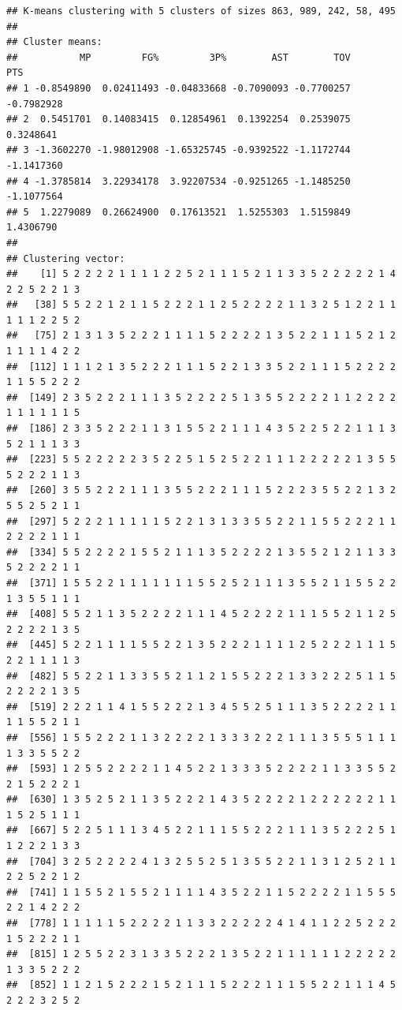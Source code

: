 \documentclass[]{book}
\begin{document}
\begin{verbatim}
## K-means clustering with 5 clusters of sizes 863, 989, 242, 58, 495
## 
## Cluster means:
##           MP         FG%         3P%        AST        TOV        PTS
## 1 -0.8549890  0.02411493 -0.04833668 -0.7090093 -0.7700257 -0.7982928
## 2  0.5451701  0.14083415  0.12854961  0.1392254  0.2539075  0.3248641
## 3 -1.3602270 -1.98012908 -1.65325745 -0.9392522 -1.1172744 -1.1417360
## 4 -1.3785814  3.22934178  3.92207534 -0.9251265 -1.1485250 -1.1077564
## 5  1.2279089  0.26624900  0.17613521  1.5255303  1.5159849  1.4306790
## 
## Clustering vector:
##    [1] 5 2 2 2 2 1 1 1 1 2 2 5 2 1 1 1 5 2 1 1 3 3 5 2 2 2 2 2 1 4 2 2 5 2 2 1 3
##   [38] 5 5 2 2 1 2 1 1 5 2 2 2 1 1 2 5 2 2 2 2 1 1 3 2 5 1 2 2 1 1 1 1 1 2 2 5 2
##   [75] 2 1 3 1 3 5 2 2 2 1 1 1 1 5 2 2 2 2 1 3 5 2 2 1 1 1 5 2 1 2 1 1 1 1 4 2 2
##  [112] 1 1 1 2 1 3 5 2 2 2 1 1 1 5 2 2 1 3 3 5 2 2 1 1 1 5 2 2 2 2 1 1 5 5 2 2 2
##  [149] 2 3 5 2 2 2 1 1 1 3 5 2 2 2 2 5 1 3 5 5 2 2 2 2 1 1 2 2 2 2 1 1 1 1 1 1 5
##  [186] 2 3 3 5 2 2 2 1 1 3 1 5 5 2 2 1 1 1 4 3 5 2 2 5 2 2 1 1 1 3 5 2 1 1 1 3 3
##  [223] 5 5 2 2 2 2 2 3 5 2 2 5 1 5 2 5 2 2 1 1 1 2 2 2 2 2 1 3 5 5 5 2 2 2 1 1 3
##  [260] 3 5 5 2 2 2 1 1 1 3 5 5 2 2 2 1 1 1 5 2 2 2 3 5 5 2 2 1 3 2 5 5 2 5 2 1 1
##  [297] 5 2 2 2 1 1 1 1 1 5 2 2 1 3 1 3 3 5 5 2 2 1 1 5 5 2 2 2 1 1 2 2 2 2 1 1 1
##  [334] 5 5 2 2 2 2 1 5 5 2 1 1 1 3 5 2 2 2 2 1 3 5 5 2 1 2 1 1 3 3 5 2 2 2 2 1 1
##  [371] 1 5 5 2 2 1 1 1 1 1 1 1 5 5 2 5 2 1 1 1 3 5 5 2 1 1 5 5 2 2 1 3 5 5 1 1 1
##  [408] 5 5 2 1 1 3 5 2 2 2 2 1 1 1 4 5 2 2 2 2 1 1 1 5 5 2 1 1 2 5 2 2 2 2 1 3 5
##  [445] 5 2 2 1 1 1 1 5 5 2 2 1 3 5 2 2 2 1 1 1 1 2 5 2 2 2 1 1 1 5 2 2 1 1 1 1 3
##  [482] 5 5 2 2 1 1 3 3 5 5 2 1 1 2 1 5 5 2 2 2 1 3 3 2 2 2 5 1 1 5 2 2 2 2 1 3 5
##  [519] 2 2 2 1 1 4 1 5 5 2 2 2 1 3 4 5 5 2 5 1 1 1 3 5 2 2 2 2 1 1 1 1 5 5 2 1 1
##  [556] 1 5 5 2 2 2 1 1 3 2 2 2 2 1 3 3 3 2 2 2 1 1 1 3 5 5 5 1 1 1 1 3 3 5 5 2 2
##  [593] 1 2 5 5 2 2 2 2 1 1 4 5 2 2 1 3 3 3 5 2 2 2 2 1 1 3 3 5 5 2 2 1 5 2 2 2 1
##  [630] 1 3 5 2 5 2 1 1 3 5 2 2 2 1 4 3 5 2 2 2 2 1 2 2 2 2 2 2 1 1 1 5 2 5 1 1 1
##  [667] 5 2 2 5 1 1 1 3 4 5 2 2 1 1 1 5 5 2 2 2 1 1 1 3 5 2 2 2 5 1 1 2 2 2 1 3 3
##  [704] 3 2 5 2 2 2 2 4 1 3 2 5 5 2 5 1 3 5 5 2 2 1 1 3 1 2 5 2 1 1 2 2 5 2 2 1 2
##  [741] 1 1 5 5 2 1 5 5 2 1 1 1 1 4 3 5 2 2 1 1 5 2 2 2 2 1 1 5 5 5 2 2 1 4 2 2 2
##  [778] 1 1 1 1 1 5 2 2 2 2 1 1 3 3 2 2 2 2 2 4 1 4 1 1 2 2 5 2 2 2 1 5 2 2 2 1 1
##  [815] 1 2 5 5 2 2 3 1 3 3 5 2 2 2 1 3 5 2 2 1 1 1 1 1 1 2 2 2 2 2 1 3 3 5 2 2 2
##  [852] 1 1 2 1 5 2 2 2 1 5 2 1 1 1 5 2 2 2 1 1 1 5 5 2 2 1 1 1 4 5 2 2 2 3 2 5 2

\end{verbatim}
\end{document}
